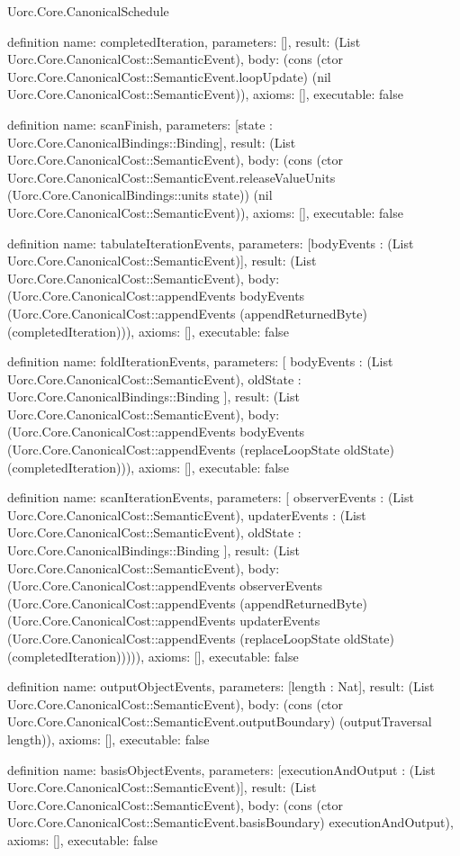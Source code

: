 \begin{lexlean}{Uorc.Core.CanonicalSchedule}
\begin{semanticmodule}
definition{
  name: completedIteration,
  parameters: [],
  result: (List Uorc.Core.CanonicalCost::SemanticEvent),
  body: (cons (ctor Uorc.Core.CanonicalCost::SemanticEvent.loopUpdate) (nil Uorc.Core.CanonicalCost::SemanticEvent)),
  axioms: [],
  executable: false
}

definition{
  name: scanFinish,
  parameters: [state : Uorc.Core.CanonicalBindings::Binding],
  result: (List Uorc.Core.CanonicalCost::SemanticEvent),
  body: (cons (ctor Uorc.Core.CanonicalCost::SemanticEvent.releaseValueUnits (Uorc.Core.CanonicalBindings::units state)) (nil Uorc.Core.CanonicalCost::SemanticEvent)),
  axioms: [],
  executable: false
}

definition{
  name: tabulateIterationEvents,
  parameters: [bodyEvents : (List Uorc.Core.CanonicalCost::SemanticEvent)],
  result: (List Uorc.Core.CanonicalCost::SemanticEvent),
  body: (Uorc.Core.CanonicalCost::appendEvents bodyEvents (Uorc.Core.CanonicalCost::appendEvents (appendReturnedByte) (completedIteration))),
  axioms: [],
  executable: false
}

definition{
  name: foldIterationEvents,
  parameters: [
    bodyEvents : (List Uorc.Core.CanonicalCost::SemanticEvent),
    oldState : Uorc.Core.CanonicalBindings::Binding
  ],
  result: (List Uorc.Core.CanonicalCost::SemanticEvent),
  body: (Uorc.Core.CanonicalCost::appendEvents bodyEvents (Uorc.Core.CanonicalCost::appendEvents (replaceLoopState oldState) (completedIteration))),
  axioms: [],
  executable: false
}

definition{
  name: scanIterationEvents,
  parameters: [
    observerEvents : (List Uorc.Core.CanonicalCost::SemanticEvent),
    updaterEvents : (List Uorc.Core.CanonicalCost::SemanticEvent),
    oldState : Uorc.Core.CanonicalBindings::Binding
  ],
  result: (List Uorc.Core.CanonicalCost::SemanticEvent),
  body: (Uorc.Core.CanonicalCost::appendEvents observerEvents (Uorc.Core.CanonicalCost::appendEvents (appendReturnedByte) (Uorc.Core.CanonicalCost::appendEvents updaterEvents (Uorc.Core.CanonicalCost::appendEvents (replaceLoopState oldState) (completedIteration))))),
  axioms: [],
  executable: false
}

definition{
  name: outputObjectEvents,
  parameters: [length : Nat],
  result: (List Uorc.Core.CanonicalCost::SemanticEvent),
  body: (cons (ctor Uorc.Core.CanonicalCost::SemanticEvent.outputBoundary) (outputTraversal length)),
  axioms: [],
  executable: false
}

definition{
  name: basisObjectEvents,
  parameters: [executionAndOutput : (List Uorc.Core.CanonicalCost::SemanticEvent)],
  result: (List Uorc.Core.CanonicalCost::SemanticEvent),
  body: (cons (ctor Uorc.Core.CanonicalCost::SemanticEvent.basisBoundary) executionAndOutput),
  axioms: [],
  executable: false
}


\end{semanticmodule}
\end{lexlean}
